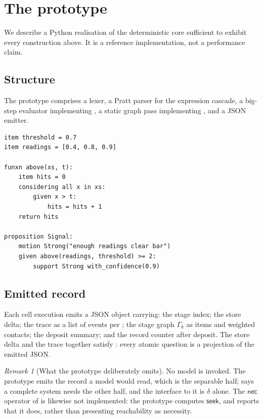 \documentclass[twocolumn,11pt,a4paper]{article}
\theoremstyle{sup}
\theoremstyle{definition}
\theoremstyle{remark}
\newtheorem{remark}[theorem]{Remark}
\newcommand{\Gph}{\Gamma}
\newcommand{\seek}{\mathsf{seek}}
\newcommand{\nec}{\mathsf{nec}}
\newcommand{\dep}{\delta}
\begin{document}
\section{The prototype}
\label{sec:proto}

We describe a Python realisation of the deterministic core sufficient to
exhibit every construction above. It is a reference implementation, not a
performance claim.

\subsection{Structure}

The prototype comprises a lexer, a Pratt parser for the expression cascade, a
big-step evaluator implementing , a static graph pass
implementing , and a JSON emitter.

\begin{lstlisting}
item threshold = 0.7
item readings = [0.4, 0.8, 0.9]

funxn above(xs, t):
    item hits = 0
    considering all x in xs:
        given x > t:
            hits = hits + 1
    return hits

proposition Signal:
    motion Strong("enough readings clear bar")
    given above(readings, threshold) >= 2:
        support Strong with_confidence(0.9)
\end{lstlisting}

\subsection{Emitted record}

Each cell execution emits a JSON object carrying: the stage index; the store
delta; the trace as a list of events per ; the stage graph
$\Gph_k$ as items and weighted contacts; the deposit summary; and the record
counter after deposit. The store delta and the trace together satisfy
: every atomic question is a projection of the emitted JSON.

\begin{remark}[What the prototype deliberately omits]
\label{rem:proto-omits}
No model is invoked. The prototype emits the record a model would read, which
is the separable half;  says a complete system needs
the other half, and the interface to it is $\dep$ alone. The $\nec$ operator of
 is likewise not implemented: the prototype computes
$\seek$, and reports that it does, rather than presenting reachability as
necessity.
\end{remark}
\end{document}
